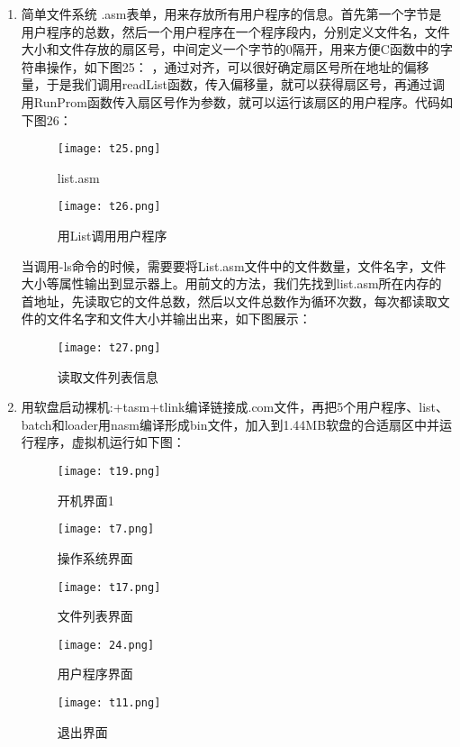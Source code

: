 \documentclass[UTF8]{article}
\begin{document}
\begin{enumerate}[1)]
  \item 简单文件系统
  .asm表单，用来存放所有用户程序的信息。首先第一个字节是用户程序的总数，然后一个用户程序在一个程序段内，分别定义文件名，文件大小和文件存放的扇区号，中间定义一个字节的0隔开，用来方便C函数中的字符串操作，如下图25：  
  ，通过对齐，可以很好确定扇区号所在地址的偏移量，于是我们调用readList函数，传入偏移量，就可以获得扇区号，再通过调用RunProm函数传入扇区号作为参数，就可以运行该扇区的用户程序。代码如下图26：
  \begin{figure}[htbp]
  		\begin{minipage}[t]{0.5\linewidth}
			\centering
			\texttt{[image: t25.png]}
			\caption{list.asm}
		\end{minipage}
		\begin{minipage}[t]{0.5\linewidth}
			\centering
			\texttt{[image: t26.png]}
			\caption{用List调用用户程序}
		\end{minipage}
	 \end{figure}
	 \newpage
	\par 当调用-ls命令的时候，需要要将List.asm文件中的文件数量，文件名字，文件大小等属性输出到显示器上。用前文的方法，我们先找到list.asm所在内存的首地址，先读取它的文件总数，然后以文件总数作为循环次数，每次都读取文件的文件名字和文件大小并输出出来，如下图展示：
	\begin{figure}[htbp]
			\centering
			\texttt{[image: t27.png]}
			\caption{读取文件列表信息}
	 \end{figure}
	 \newpage
  \item 用软盘启动裸机:+tasm+tlink编译链接成.com文件，再把5个用户程序、list、batch和loader用nasm编译形成bin文件，加入到1.44MB软盘的合适扇区中并运行程序，虚拟机运行如下图：
  \begin{figure}[htbp]
			\centering
			\texttt{[image: t19.png]}
			\caption{开机界面1}
	\end{figure}
	 \begin{figure}[htbp]
			\centering
			\texttt{[image: t7.png]}
			\caption{操作系统界面}
		\end{figure}
		\begin{figure}[htbp]
			\centering
			\texttt{[image: t17.png]}
			\caption{文件列表界面}
		\end{figure}
		\begin{figure}[htbp]
			\centering
			\texttt{[image: 24.png]}
			\caption{用户程序界面}
		\end{figure}
		\begin{figure}[htbp]
			\centering
			\texttt{[image: t11.png]}
			\caption{退出界面}
		\end{figure}

	
  \end{enumerate}
\end{document}
